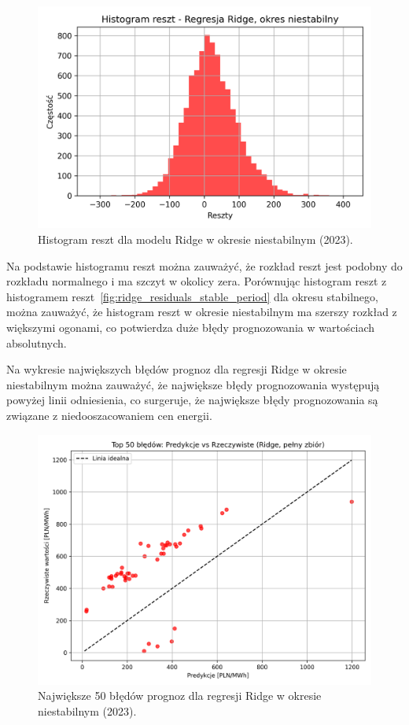 \begin{figure}[H]
    \centering
    \includegraphics[width=1.0\textwidth]{../../plots/predicts/residuals_histogram_Ridge_not_stable_period.png}
    \caption{Histogram reszt dla modelu Ridge w okresie niestabilnym (2023).}
    \label{fig:residuals_nonstable_histogram_ridge}
\end{figure}

Na podstawie histogramu reszt można zauważyć, że rozkład reszt jest podobny do rozkładu normalnego i ma szczyt w okolicy zera. Porównując histogram reszt z histogramem reszt~\ref{fig:ridge_residuals_stable_period} dla okresu stabilnego, można zauważyć, że histogram reszt w okresie niestabilnym ma szerszy rozkład z większymi ogonami, co potwierdza duże błędy prognozowania w wartościach absolutnych.

Na wykresie największych błędów prognoz dla regresji Ridge w okresie niestabilnym można zauważyć, że największe błędy prognozowania występują powyżej linii odniesienia, co surgeruje, że największe błędy prognozowania są związane z niedooszacowaniem cen energii.

\begin{figure}[H]
    \centering
    \includegraphics[width=1.0\textwidth]{../../plots/predicts/top_50_errors_Ridge_full_not_stable_period.png}
    \caption{Największe 50 błędów prognoz dla regresji Ridge w okresie niestabilnym (2023).}
    \label{fig:top_50_errors_Ridge_full_not_stable_period}
\end{figure}

